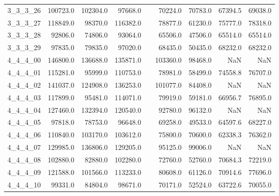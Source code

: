\begin{longtable}{lrrrcrrrr}
3\_3\_3\_26      &    100723.0 &      102304.0 &        97668.0 &&       70224.0 &         70783.0 &          67394.5 &          69038.0 \\
3\_3\_3\_27      &    118849.0 &       98370.0 &       116382.0 &&       78877.0 &         61230.0 &          75777.0 &          78318.0 \\
3\_3\_3\_28      &     92806.0 &       74806.0 &        93064.0 &&       65506.0 &         47506.0 &          65514.0 &          65514.0 \\
3\_3\_3\_29      &     97835.0 &       79835.0 &        97020.0 &&       68435.0 &         50435.0 &          68232.0 &          68232.0 \\
4\_4\_4\_00      &    146800.0 &      136688.0 &       135871.0 &&      103360.0 &         98468.0 &              NaN &              NaN \\
4\_4\_4\_01      &    115281.0 &       95999.0 &       110753.0 &&       78981.0 &         58499.0 &          74558.8 &          76707.0 \\
4\_4\_4\_02      &    141037.0 &      124908.0 &       136253.0 &&      101077.0 &         84408.0 &              NaN &              NaN \\
4\_4\_4\_03      &    117899.0 &       95481.0 &       114071.0 &&       79919.0 &         59181.0 &          66956.7 &          76895.0 \\
4\_4\_4\_04      &    127460.0 &      132394.0 &       120540.0 &&       92780.0 &         96132.0 &              NaN &              NaN \\
4\_4\_4\_05      &     97818.0 &       78753.0 &        96648.0 &&       69258.0 &         49533.0 &          64597.6 &          68227.0 \\
4\_4\_4\_06      &    110840.0 &      103170.0 &       103612.0 &&       75800.0 &         70600.0 &          62338.3 &          76362.0 \\
4\_4\_4\_07      &    129985.0 &      136806.0 &       129205.0 &&       95125.0 &         99006.0 &              NaN &              NaN \\
4\_4\_4\_08      &    102880.0 &       82880.0 &       102280.0 &&       72760.0 &         52760.0 &          70684.3 &          72219.0 \\
4\_4\_4\_09      &    121588.0 &      101566.0 &       113233.0 &&       80608.0 &         61126.0 &          70914.6 &          77696.0 \\
4\_4\_4\_10      &     99331.0 &       84804.0 &        98671.0 &&       70171.0 &         52524.0 &          63722.6 &          70055.0 \\

\end{longtable}
